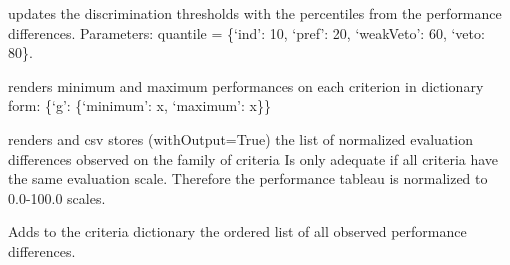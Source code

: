 \documentclass[letterpaper,10pt,english]{sphinxmanual}
\begin{document}
\begin{fulllineitems}
\begin{fulllineitems}
\end{fulllineitems}


\begin{fulllineitems}
\label{techDoc:perfTabs.PerformanceTableau.computeDefaultDiscriminationThresholds}
updates the discrimination thresholds with the percentiles
from the performance differences.
Parameters: quantile = \{`ind': 10, `pref': 20, `weakVeto': 60, `veto: 80\}.

\end{fulllineitems}


\begin{fulllineitems}
\label{techDoc:perfTabs.PerformanceTableau.computeMinMaxEvaluations}
renders minimum and maximum performances on each criterion
in dictionary form: \{`g': \{`minimum': x, `maximum': x\}\}

\end{fulllineitems}


\begin{fulllineitems}
\label{techDoc:perfTabs.PerformanceTableau.computeNormalizedDiffEvaluations}
renders and csv stores (withOutput=True) the
list of normalized evaluation differences observed on the family of criteria
Is only adequate if all criteria have the same
evaluation scale. Therefore the performance tableau is normalized to 0.0-100.0 scales.

\end{fulllineitems}


\begin{fulllineitems}
\label{techDoc:perfTabs.PerformanceTableau.computePerformanceDifferences}
Adds to the criteria dictionary the ordered list of all observed performance differences.


\end{fulllineitems}
\end{fulllineitems}
\end{document}
